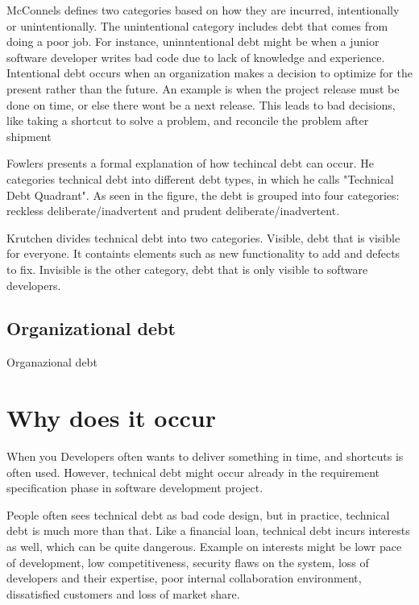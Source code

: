 McConnels defines two categories based on how they are incurred, intentionally or unintentionally. The unintentional category includes debt that comes from doing a poor job. For instance, uninntentional debt might be when a junior software developer writes bad code due to lack of knowledge and experience. Intentional debt occurs when an organization makes a decision to optimize for the present rather than the future. An example is when the project release must be done on time, or else there wont be a next release. This leads to bad decisions, like taking a shortcut to solve a problem, and reconcile the problem after shipment

Fowlers presents a formal explanation of how techincal debt can occur. He categories technical debt into different debt types, in which he calls "Technical Debt Quadrant". As seen in the figure, the debt is grouped into four categories: reckless deliberate/inadvertent and prudent deliberate/inadvertent. 

Krutchen divides technical debt into two categories. Visible, debt that is visible for everyone. It containts elements such as new functionality to add and defects to fix. Invisible is the other category, debt that is only visible to software developers.

\subsection{Organizational debt}
Organazional debt

\section{Why does it occur}
When you Developers often wants to deliver something in time, and shortcuts is often used. However, technical debt might occur already in the requirement specification phase in software development project. 

People often sees technical debt as bad code design, but in practice, technical debt is much more than that. Like a financial loan, technical debt incurs interests as well, which can be quite dangerous. Example on interests might be lowr pace of development, low competitiveness, security flaws on the system, loss of developers and their expertise, poor internal collaboration environment, dissatisfied customers and loss of market share. 

